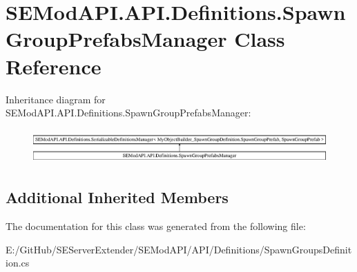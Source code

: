\hypertarget{class_s_e_mod_a_p_i_1_1_a_p_i_1_1_definitions_1_1_spawn_group_prefabs_manager}{}\section{S\+E\+Mod\+A\+P\+I.\+A\+P\+I.\+Definitions.\+Spawn\+Group\+Prefabs\+Manager Class Reference}
\label{class_s_e_mod_a_p_i_1_1_a_p_i_1_1_definitions_1_1_spawn_group_prefabs_manager}
Inheritance diagram for S\+E\+Mod\+A\+P\+I.\+A\+P\+I.\+Definitions.\+Spawn\+Group\+Prefabs\+Manager\+:\begin{figure}[H]
\begin{center}
\leavevmode
\includegraphics[height=1.341317cm]{class_s_e_mod_a_p_i_1_1_a_p_i_1_1_definitions_1_1_spawn_group_prefabs_manager}
\end{center}
\end{figure}
\subsection*{Additional Inherited Members}


The documentation for this class was generated from the following file\+:\begin{DoxyCompactItemize}
\item 
E\+:/\+Git\+Hub/\+S\+E\+Server\+Extender/\+S\+E\+Mod\+A\+P\+I/\+A\+P\+I/\+Definitions/Spawn\+Groups\+Definition.\+cs\end{DoxyCompactItemize}
